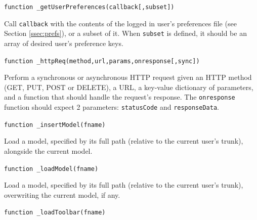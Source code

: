 \documentclass{article}
\numberwithin{equation}{section}
\numberwithin{figure}{section}
\begin{document}
\begin{center}	{\large \texttt{function \_getUserPreferences(callback[,subset])}} \end{center}

Call \texttt{callback} with the contents of the logged in user's preferences file (see Section \ref{ssec:prefs}), or a subset of it. When \texttt{subset} is defined, it should be an array of desired user's preference keys.\\
\vspace*{1em}


\begin{center}	{\large \texttt{function \_httpReq(method,url,params,onresponse[,sync])}} \end{center}

Perform a synchronous or asynchronous HTTP request given an HTTP method (GET, PUT, POST or DELETE), a URL, a key-value dictionary of parameters, and a function that should handle the request's response. The \texttt{onresponse} function should expect 2 parameters: \texttt{statusCode} and \texttt{responseData}.\\
\vspace*{1em}


\begin{center}	{\large \texttt{function \_insertModel(fname)}} \end{center}

Load a model, specified by its full path (relative to the current user's trunk), alongside the current model.\\
\vspace*{1em}


\begin{center}	{\large \texttt{function \_loadModel(fname)}} \end{center}

Load a model, specified by its full path (relative to the current user's trunk), overwriting the current model, if any.\\
\vspace*{1em}


\begin{center}	{\large \texttt{function \_loadToolbar(fname)}} \end{center}
\end{document}
